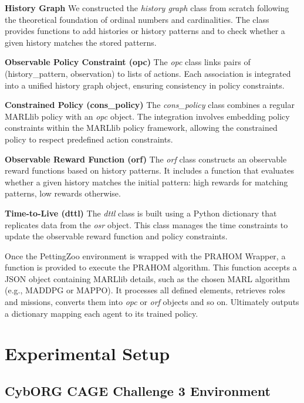 \documentclass[conference]{IEEEtran}
\begin{document}
\textbf{History Graph} \quad We constructed the \textit{history graph} class from scratch following the theoretical foundation of ordinal numbers and cardinalities. The class provides functions to add histories or history patterns and to check whether a given history matches the stored patterns.

\textbf{Observable Policy Constraint (opc)} \quad The \textit{opc} class links pairs of (history\_pattern, observation) to lists of actions. Each association is integrated into a unified history graph object, ensuring consistency in policy constraints.

\textbf{Constrained Policy (cons\_policy)} \quad The \textit{cons\_policy} class combines a regular MARLlib policy with an \textit{opc} object. The integration involves embedding policy constraints within the MARLlib policy framework, allowing the constrained policy to respect predefined action constraints.

\textbf{Observable Reward Function (orf)} \quad The \textit{orf} class constructs an observable reward functions based on history patterns. It includes a function that evaluates whether a given history matches the initial pattern: high rewards for matching patterns, low rewards otherwise.

\textbf{Time-to-Live (dttl)} \quad The \textit{dttl} class is built using a Python dictionary that replicates data from the \textit{osr} object. This class manages the time constraints to update the observable reward function and policy constraints.

Once the PettingZoo environment is wrapped with the PRAHOM Wrapper, a function is provided to execute the PRAHOM algorithm. This function accepts a JSON object containing MARLlib details, such as the chosen MARL algorithm (e.g., MADDPG or MAPPO). It processes all defined elements, retrieves roles and missions, converts them into \textit{opc} or \textit{orf} objects and so on. Ultimately outputs a dictionary mapping each agent to its trained policy.

\section{Experimental Setup}\label{sec:experimental_setup}

\subsection{CybORG CAGE Challenge 3 Environment}
\end{document}
